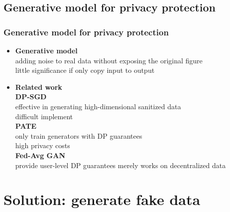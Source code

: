 \documentclass{beamer}
\begin{document}
\subsection{Generative model for privacy protection}
\begin{frame}
    \frametitle{Generative model for privacy protection}
    \begin{itemize}
        \item \textbf{Generative model}\\[5pt]
        adding noise to real data without exposing the original figure\\
        little significance if only copy input to output\\[10pt]
        \item \textbf{Related work}\\[5pt]
        \textbf{DP-SGD}\cite{ref2}\\
        effective in generating high-dimensional sanitized data\\
        difficult implement\\
        \textbf{PATE}\\
        only train generators with DP guarantees\\
        high privacy costs\\
        \textbf{Fed-Avg GAN}\\
        provide user-level DP guarantees
        merely works on decentralized data
    \end{itemize}
\end{frame}

\section{Solution: generate fake data}
\end{document}
